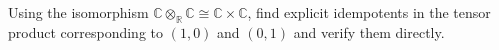 \begin{problem}\label{chall:vi24-01}
Using the isomorphism $\mathbb C\otimes_{\mathbb R}\mathbb C\cong\mathbb C\times\mathbb C$, find explicit idempotents in the tensor product corresponding to $(1,0)$ and $(0,1)$ and verify them directly.
\end{problem}
